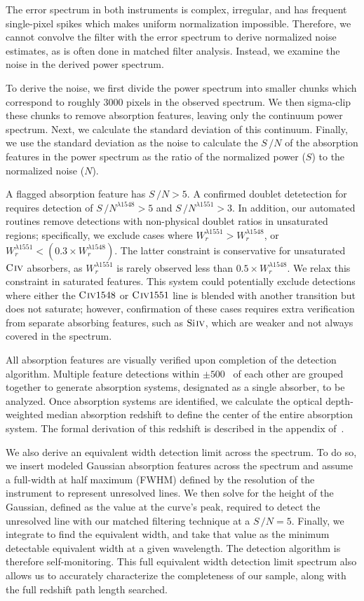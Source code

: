 \documentclass[linenumbers,twocolumn]{aastex61}
\begin{document}
The error spectrum in both instruments is complex, irregular, and has frequent single-pixel spikes which makes uniform normalization impossible. Therefore, we cannot convolve the filter with the error spectrum to derive normalized noise estimates, as is often done in matched filter analysis. Instead, we examine the noise in the derived power spectrum.

To derive the noise, we first divide the power spectrum into smaller chunks which correspond to roughly 3000 pixels in the observed spectrum. We then sigma-clip these chunks to remove absorption features, leaving only the continuum power spectrum. Next, we calculate the standard deviation of this continuum. Finally, we use the standard deviation as the noise to calculate the $S\,/N$ of the absorption features in the power spectrum as the ratio of the normalized power ($S$) to the normalized noise ($N$).

A flagged absorption feature has $S\,/N > 5$. A confirmed doublet detetection for {\CIVdblt} requires detection of $S\,/N^{\lambda1548} > 5$ and $S\,/N^{\lambda1551} > 3$. In addition, our automated routines remove detections with non-physical doublet ratios in unsaturated regions; specifically, we exclude cases where $W_r^{\lambda1551} > W_r^{\lambda1548}$, or $W_r^{\lambda1551} < \left(0.3 \times W_r^{\lambda1548}\right)$. The latter constraint is conservative for unsaturated ${\hbox{{\rm C}\kern 0.1em{\sc iv}}}$ absorbers, as $W_r^{\lambda1551}$ is rarely observed less than $0.5 \times W_r^{\lambda1548}$. We relax this constraint in saturated features. This system could potentially exclude detections where either the ${\hbox{{\rm C}\kern 0.1em{\sc iv}}1548}$ or ${\hbox{{\rm C}\kern 0.1em{\sc iv}}1551}$ line is blended with another transition but does not saturate; however, confirmation of these cases requires extra verification from separate absorbing features, such as ${\hbox{{\rm Si}\kern 0.1em{\sc iv}}}$, which are weaker and not always covered in the spectrum.

All absorption features are visually verified upon completion of the detection algorithm. Multiple feature detections within $\pm 500$~{\kms} of each other are grouped together to generate absorption systems, designated as a single absorber, to be analyzed. Once absorption systems are identified, we calculate the optical depth-weighted median absorption redshift to define the center of the entire absorption system. The formal derivation of this redshift is described in the appendix of~\cite{Churchill2001}.

We also derive an equivalent width detection limit across the spectrum. To do so, we insert modeled Gaussian absorption features across the spectrum and assume a full-width at half maximum (FWHM) defined by the resolution of the instrument to represent unresolved lines. We then solve for the height of the Gaussian, defined as the value at the curve's peak, required to detect the unresolved line with our matched filtering technique at a $S\,/N = 5$. Finally, we integrate to find the equivalent width, and take that value as the minimum detectable equivalent width at a given wavelength. The detection algorithm is therefore self-monitoring. This full equivalent width detection limit spectrum also allows us to accurately characterize the completeness of our sample, along with the full redshift path length searched.
\end{document}
